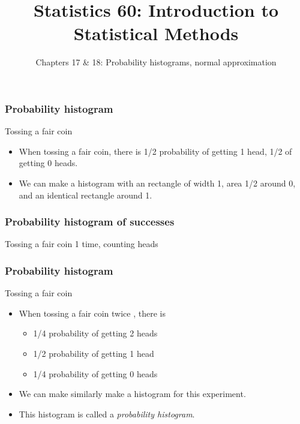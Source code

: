 \documentclass[handout]{beamer}
\title{Statistics 60: Introduction to Statistical Methods}
\subtitle{Chapters 17 \& 18: Probability histograms, normal approximation}
\author{}%
\begin{document}
   \begin{frame}
   \titlepage
   \end{frame}


   \begin{frame} \frametitle{Probability histogram}

   \begin{block}
     {Tossing a fair coin}
     \begin{itemize}
     \item When tossing a fair coin, there is 1/2 probability of getting
       1 head, 1/2 of getting 0 heads.

       \item We can make a histogram with an rectangle of width 1,
         area 1/2 around 0, and an identical rectangle around 1.
     \end{itemize}
   \end{block}
   \end{frame}



   \begin{frame}
   \frametitle{Probability histogram of successes}
   \begin{center}
   \end{center}
   Tossing a fair coin 1 time, counting heads
   \end{frame}


   \begin{frame} \frametitle{Probability histogram}

   \begin{block}
     {Tossing a fair coin}
     \begin{itemize}
     \item When tossing a fair coin twice , there is
       \begin{itemize}
       \item 1/4 probability of getting 2 heads
       \item 1/2 probability of getting 1 head
       \item 1/4 probability of getting 0 heads
       \end{itemize}
       \item We can make similarly make a histogram for this experiment.
       \item This histogram is called a {\em probability histogram}.
     \end{itemize}
   \end{block}
   \end{frame}
\end{document}
